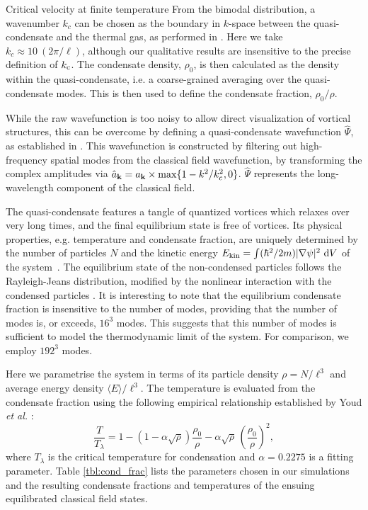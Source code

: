 \begin{chapter}{\label{cha:nonequib}Critical velocity at finite temperature}
From the bimodal distribution, a wavenumber $k_c$ can be chosen as the boundary in $k$-space between the quasi-condensate and the thermal gas, as performed in \cite{PhysRevA.66.013603}.  Here we take $k_c \approx 10~(2\pi / \ell)$, although our qualitative results are insensitive to the precise definition of $k_{\rm c}$.  The condensate density, $\rho_0$, is then calculated as the density within the quasi-condensate, i.e. a coarse-grained averaging over the quasi-condensate modes.  This is then used to define the condensate fraction, $\rho_0/\rho$.

While the raw wavefunction is too noisy to allow direct visualization of vortical structures, this can be overcome by defining a quasi-condensate wavefunction $\hat{\Psi}$, as established in \cite{PhysRevA.66.013603}.   This wavefunction is constructed by filtering out high-frequency spatial modes from the classical field wavefunction, by 
transforming the complex amplitudes via
$\hat{a}_{{\bf k}} = a_{{\bf k}}\times\max\{1-k^{2}/k_c^2,0\}$. $\hat{\Psi}$ represents the long-wavelength component of the classical field.

The quasi-condensate features a tangle of quantized vortices which relaxes over very long times, and the final equilibrium state is free of vortices.  Its physical properties, e.g. temperature and condensate fraction, are uniquely determined by the number of particles $N$ and the kinetic energy $E_{\rm kin}=\int (\hbar^2/2m)|\nabla \psi|^2~{\rm d}V$ of the system~\cite{PhysRevLett.95.263901}.  The equilibrium state of the non-condensed particles follows the Rayleigh-Jeans distribution, modified by the nonlinear interaction with the condensed particles \cite{PhysRevLett.95.263901}.  It is interesting to note that the equilibrium condensate fraction is insensitive to the number of modes, providing that the number of modes is, or exceeds, $16^3$ modes.  This suggests that this number of modes is sufficient to model the thermodynamic limit of the system. For comparison, we employ $192^3$ modes.

Here we parametrise the system in terms of its particle density $\rho = N/\ell^3$ and average energy density $\langle E \rangle/\ell^3$.
The temperature is evaluated from the condensate fraction using the following empirical relationship established by Youd {\it et al.} \cite{berloff_2007}:
\begin{equation}
  \frac{T}{T_\lambda} = 1 - (1 - \alpha\sqrt{\rho})\frac{\rho_0}{\rho} - \alpha\sqrt{\rho}\,\left(\frac{\rho_0}{\rho}\right)^2,
  \label{eq:temp}
\end{equation}
where $T_{\lambda}$ is the critical temperature for condensation
and $\alpha=0.2275$ is a fitting parameter.
Table \ref{tbl:cond_frac} lists the parameters chosen in our simulations
and the resulting condensate fractions and temperatures
of the ensuing equilibrated classical field states.


\end{chapter}
